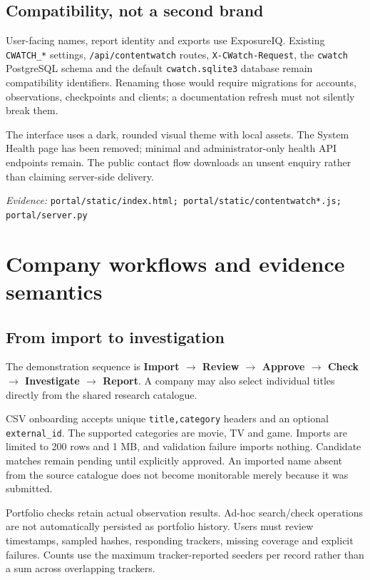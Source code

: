 \documentclass[11pt,a4paper]{article}
\newcommand{\code}[1]{{\small\nolinkurl{#1}}}
\newcommand{\source}[1]{{\footnotesize\textit{Evidence:} \code{#1}\par}}
\newcommand{\chapterpage}[1]{\clearpage\section{#1}}
\begin{document}
\subsection{Compatibility, not a second brand}
User-facing names, report identity and exports use ExposureIQ. Existing
\code{CWATCH_*} settings, \code{/api/contentwatch} routes,
\code{X-CWatch-Request}, the \code{cwatch} PostgreSQL schema and the default
\code{cwatch.sqlite3} database remain compatibility identifiers.
Renaming those would require migrations for accounts, observations,
checkpoints and clients; a documentation refresh must not silently break
them.

The interface uses a dark, rounded visual theme with local assets. The
System Health page has been removed; minimal and administrator-only health
API endpoints remain. The public contact flow downloads an unsent enquiry
rather than claiming server-side delivery.

\source{portal/static/index.html; portal/static/contentwatch*.js; portal/server.py}

\chapterpage{Company workflows and evidence semantics}
\subsection{From import to investigation}
The demonstration sequence is \textbf{Import $\rightarrow$ Review
$\rightarrow$ Approve $\rightarrow$ Check $\rightarrow$ Investigate
$\rightarrow$ Report}. A company may also select individual titles directly
from the shared research catalogue.

CSV onboarding accepts unique \code{title,category} headers and an optional
\code{external_id}. The supported categories are movie, TV and game.
Imports are limited to 200 rows and 1 MB, and validation failure imports
nothing. Candidate matches remain pending until explicitly approved.
An imported name absent from the source catalogue does not become
monitorable merely because it was submitted.

Portfolio checks retain actual observation results. Ad-hoc search/check
operations are not automatically persisted as portfolio history. Users
must review timestamps, sampled hashes, responding trackers, missing
coverage and explicit failures. Counts use the maximum tracker-reported
seeders per record rather than a sum across overlapping trackers.
\end{document}
